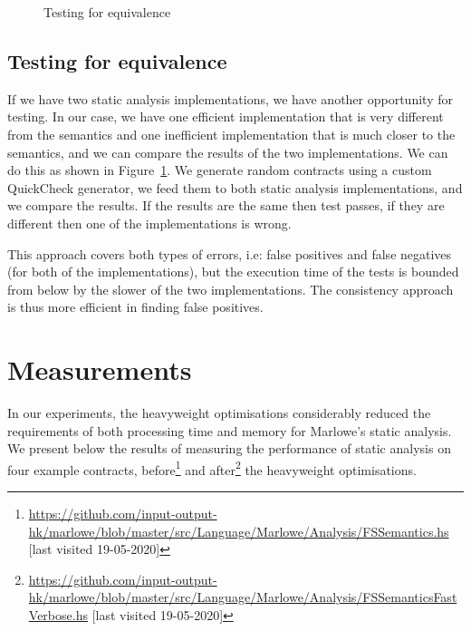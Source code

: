 \documentclass[english,runningheads]{llncs}
\begin{document}
\begin{figure}[h]
\begin{minipage}{.5\textwidth}
\begin{centering}
    \par\end{centering}
    \caption{Testing for equivalence\label{fig:Property-based-testing-for-equivalence}}
\end{minipage}
\end{figure}


\subsection{Testing for equivalence\label{subsec:Testing-for-equivalence} }

If we have two static analysis implementations, we have another opportunity
for testing. In our case, we have one efficient implementation that
is very different from the semantics and one inefficient implementation
that is much closer to the semantics, and we can compare the results of the
two implementations. We can do this as shown in Figure~\ref{fig:Property-based-testing-for-equivalence}.
We generate random contracts using a custom QuickCheck \cite{quickcheck} generator,
we feed them to both static analysis implementations, and we compare the results.
If the results are the same then test passes, if they are different then
one of the implementations is wrong.


This approach covers both types of errors, i.e: false positives and
false negatives (for both of the implementations), but the execution
time of the tests is bounded from below by the slower of the two implementations.
The consistency approach is thus more efficient in finding false positives.

\section{Measurements \label{sec:Measurements} }

In our experiments, the heavyweight optimisations considerably reduced
the requirements of both processing time and memory for Marlowe's static
analysis. %
We present below the results of measuring the performance of static analysis on
four example  contracts,
before\footnote{\url{https://github.com/input-output-hk/marlowe/blob/master/src/Language/Marlowe/Analysis/FSSemantics.hs} [last visited 19-05-2020]}
and after\footnote{\url{https://github.com/input-output-hk/marlowe/blob/master/src/Language/Marlowe/Analysis/FSSemanticsFastVerbose.hs} [last visited 19-05-2020]}
the heavyweight optimisations.
\end{document}

